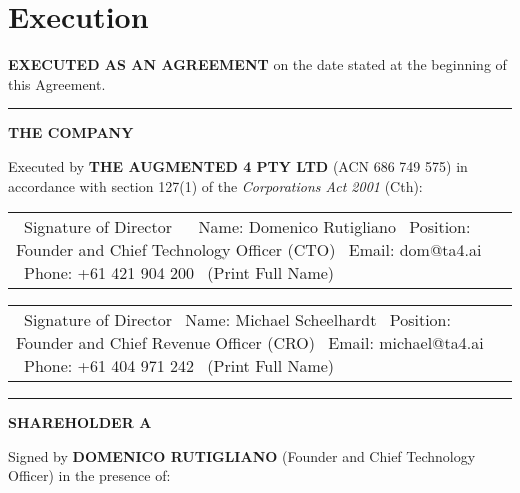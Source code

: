\section{Execution} \label{sec:execution}

\textbf{EXECUTED AS AN AGREEMENT} on the date stated at the beginning of this Agreement.

\vspace{3ex}

\noindent\rule{\textwidth}{0.4pt} %
\vspace{2ex}

\textbf{THE COMPANY}

\vspace{2ex}

\noindent Executed by \textbf{THE AUGMENTED 4 PTY LTD} (ACN 686 749 575) in accordance with section 127(1) of the \textit{Corporations Act 2001} (Cth):

\vspace{4ex}

\begin{tabular}{@{}p{}@{}}
\hrulefill \
Signature of Director \
\vspace{1ex} \
Name: Domenico Rutigliano \
Position: Founder and Chief Technology Officer (CTO) \
Email: dom@ta4.ai \
Phone: +61 421 904 200 \
(Print Full Name)
\end{tabular}
\hspace{0.05\textwidth} %
\begin{tabular}{@{}p{}@{}}
\hrulefill \
Signature of Director %
\vspace{1ex} \
Name: Michael Scheelhardt \
Position: Founder and Chief Revenue Officer (CRO) \
Email: michael@ta4.ai \
Phone: +61 404 971 242 \
(Print Full Name)
\end{tabular}

\vspace{6ex}

\noindent\rule{\textwidth}{0.4pt} %
\vspace{2ex}

\textbf{SHAREHOLDER A}

\vspace{2ex}

\noindent Signed by \textbf{DOMENICO RUTIGLIANO} (Founder and Chief Technology Officer) in the presence of:

\vspace{4ex}

